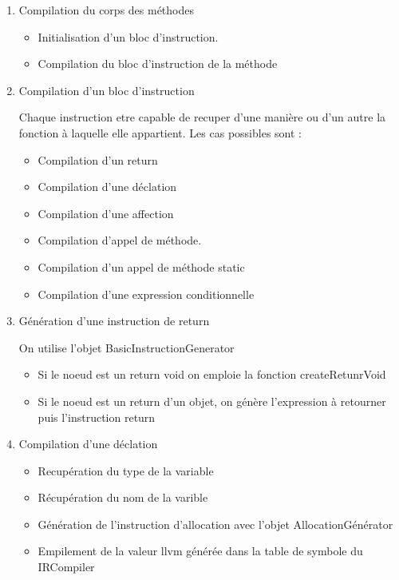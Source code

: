 \documentclass{article}
\begin{document}
\begin{enumerate}
  \item Compilation du corps des méthodes
    \begin{itemize}
      \item Initialisation d'un bloc d'instruction.
      \item Compilation du bloc d'instruction de la méthode
    \end{itemize}

  \item Compilation d'un bloc d'instruction

    Chaque instruction etre capable de recuper d'une manière ou d'un autre la fonction à laquelle elle appartient. Les cas possibles sont :
   \begin{itemize}
    \item Compilation d'un return
    \item Compilation d'une déclation
    \item Compilation d'une affection
    \item Compilation d'appel de méthode.
    \item Compilation d'un appel de méthode static
    \item Compilation d'une expression conditionnelle
   \end{itemize}

  \item Génération d'une instruction de return

    On utilise l'objet BasicInstructionGenerator
   \begin{itemize}
    \item Si le noeud est un return void on emploie la fonction createRetunrVoid
    \item Si le noeud est un return d'un objet, on génère l'expression à retourner puis l'instruction return
   \end{itemize}

  \item Compilation d'une déclation 
   \begin{itemize}
    \item Recupération du type de la variable
    \item Récupération du nom de la varible
    \item Génération de l'instruction d'allocation avec l'objet AllocationGénérator
    \item Empilement de la valeur llvm générée dans la table de symbole du IRCompiler
   \end{itemize}


\end{enumerate}
\end{document}
